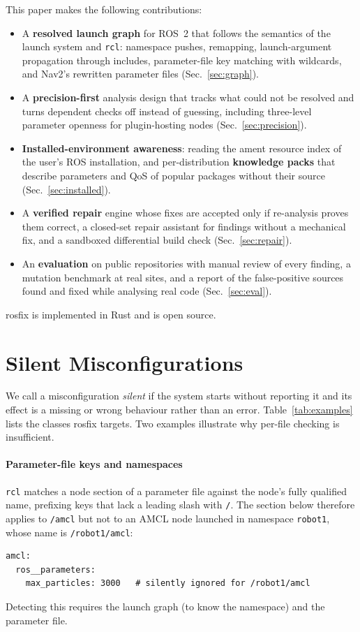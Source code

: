 ﻿\documentclass[conference]{IEEEtran}
\newcommand{\tool}{\textsf{rosfix}}
\newcommand{\code}[1]{\texttt{#1}}
\begin{document}
This paper makes the following contributions:
\begin{itemize}
\item A \textbf{resolved launch graph} for ROS~2 that follows the semantics of the launch
  system and \code{rcl}: namespace pushes, remapping, launch-argument propagation through
  includes, parameter-file key matching with wildcards, and Nav2's rewritten parameter files
  (Sec.~\ref{sec:graph}).
\item A \textbf{precision-first} analysis design that tracks what could not be resolved and
  turns dependent checks off instead of guessing, including three-level parameter openness for
  plugin-hosting nodes (Sec.~\ref{sec:precision}).
\item \textbf{Installed-environment awareness}: reading the ament resource index of the user's
  ROS installation, and per-distribution \textbf{knowledge packs} that describe parameters and
  QoS of popular packages without their source (Sec.~\ref{sec:installed}).
\item A \textbf{verified repair} engine whose fixes are accepted only if re-analysis proves
  them correct, a closed-set repair assistant for findings without a mechanical fix, and a
  sandboxed differential build check (Sec.~\ref{sec:repair}).
\item An \textbf{evaluation} on public repositories with manual review of every finding, a
  mutation benchmark at real sites, and a report of the false-positive sources found and fixed
  while analysing real code (Sec.~\ref{sec:eval}).
\end{itemize}
\tool{} is implemented in Rust and is open source.

\section{Silent Misconfigurations}
\label{sec:problem}

We call a misconfiguration \emph{silent} if the system starts without reporting it and its
effect is a missing or wrong behaviour rather than an error. Table~\ref{tab:examples} lists the
classes \tool{} targets. Two examples illustrate why per-file checking is insufficient.

\paragraph{Parameter-file keys and namespaces}
\code{rcl} matches a node section of a parameter file against the node's fully qualified name,
prefixing keys that lack a leading slash with \code{/}. The section below therefore applies to
\code{/amcl} but not to an AMCL node launched in namespace \code{robot1}, whose name is
\code{/robot1/amcl}:
\begin{lstlisting}
amcl:
  ros__parameters:
    max_particles: 3000   # silently ignored for /robot1/amcl
\end{lstlisting}
Detecting this requires the launch graph (to know the namespace) and the parameter file.
\end{document}
